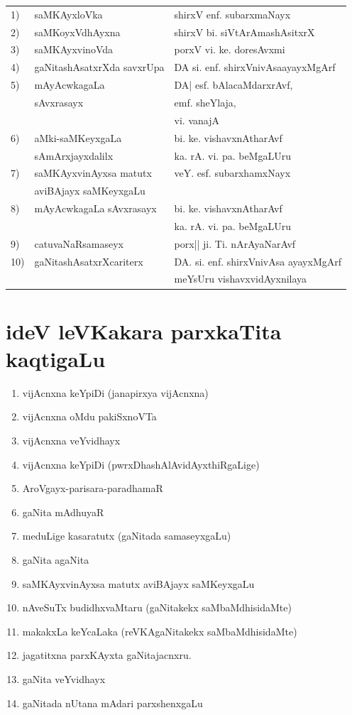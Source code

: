 \medskip
\begin{tabular}{>{\rm }ll@{\hspace{0.9cm}}l}
1) & saMKAyxloVka      & shirxV enf. subarxmaNayx\\[0.2cm]
2) & saMKoyxVdhAyxna    & shirxV bi. siVtArAmashAsitxrX\\[0.2cm]
3) & saMKAyxvinoVda    & porxV vi. ke. doresAvxmi \\[0.2cm]
4) & gaNitashAsatxrXda savxrUpa &  DA si. enf. shirxVnivAsaayayxMgArf\\[0.2cm]
5) & mAyAcwkagaLa  & DA| esf. bAlacaMdarxrAvf,\\   
   &  sAvxrasayx   & \qquad emf. sheYlaja,\\
   &               & \qquad vi. vanajA\\[0.2cm]
6) & aMki-saMKeyxgaLa  & bi. ke. vishavxnAtharAvf \\ 
   & sAmArxjayxdalilx  & ka. rA. vi. pa. beMgaLUru\\[0.2cm]
7) & saMKAyxvinAyxsa matutx & veY. esf. subarxhamxNayx\\
   & aviBAjayx saMKeyxgaLu   &                          \\[0.2cm]
8) & mAyAcwkagaLa sAvxrasayx & bi. ke. vishavxnAtharAvf\\
   &                         & ka. rA. vi. pa. beMgaLUru\\[0.2cm]
9) & catuvaNaRsamaseyx       & porx|| ji. Ti. nArAyaNarAvf\\[0.2cm]
10)&gaNitashAsatxrXcariterx  & DA. si. enf. shirxVnivAsa ayayxMgArf\\
   &                         & meYsUru vishavxvidAyxnilaya      
\end{tabular}


\vfill
\section*{ideV leVKakara parxkaTita kaqtigaLu}

\begin{enumerate}[{\rm 1)}]
\item vijAcnxna keYpiDi (janapirxya vijAcnxna)
\item vijAcnxna oMdu pakiSxnoVTa
\item vijAcnxna veYvidhayx
\item vijAcnxna keYpiDi (pwrxDhashAlAvidAyxthiRgaLige)
\item AroVgayx-parisara-paradhamaR
\item gaNita mAdhuyaR
\item meduLige kasaratutx (gaNitada samaseyxgaLu)
\item gaNita agaNita
\item saMKAyxvinAyxsa matutx aviBAjayx saMKeyxgaLu
\item nAveSuTx budidhxvaMtaru (gaNitakekx saMbaMdhisidaMte)
\item makakxLa keYcaLaka (reVKAgaNitakekx saMbaMdhisidaMte)
\item jagatitxna parxKAyxta gaNitajacnxru.
\item gaNita veYvidhayx 
\item gaNitada nUtana mAdari parxshenxgaLu
\end{enumerate}
